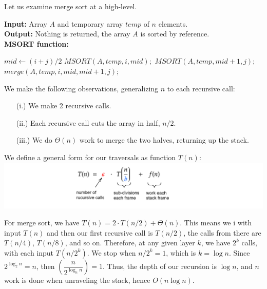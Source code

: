 \newpage 

\noindent
Let us examine merge sort at a high-level.
\begin{Func}
    \textbf{Input:} Array $A$ and temporary array $temp$ of $n$ elements.\\
    \textbf{Output:} Nothing is returned, the array $A$ is sorted by reference.\\

    \vspace{-.5em}
    \noindent
    \textbf{MSORT function:}\\
    \begin{algorithm}[H]
        \label{algo:mergesort}
            $mid \gets (i + j) / 2$\;
            $MSORT(A, temp, i, mid);$ 
            $MSORT(A, temp, mid + 1, j);$ 
            $merge(A, temp, i, mid, mid + 1, j);$ 
        
    \end{algorithm}
\end{Func}

\begin{Proof}

We make the following observations, generalizing $n$ to each recursive call:
\begin{enumerate}
    \item [(i.)] We make 2 recursive calls.
    \item [(ii.)] Each recursive call cuts the array in half, $n/2$.
    \item [(iii.)] We do $\Theta(n)$ work to merge the two halves, returning up the stack.
\end{enumerate}
\noindent
We define a general form for our traversals as function $T(n)$:\\


    \hspace{-4em}
    \includegraphics[width=1.2\textwidth]{sections/recurs/rec_form.png}

   
\noindent
For merge sort, we have $T(n) = 2\cdot T(n/2) + \Theta(n)$. This means we i with input $T(n)$ and then 
our first recursive call is $T(n/2)$, the calls from there are $T(n/4)$, $T(n/8)$, and so on. Therefore,
at any given layer $k$, we have $2^k$ calls, with each input $T(n/2^k)$. We stop when $n/2^k = 1$, which is $k = \log n$. Since $2^{\log_2 n} = n$, then $\left(\dfrac{n}{2^{\log_n n}}\right) = 1$.
Thus, the depth of our recursion is $\log n$, and $n$ work is done when unraveling the stack, hence $O(n \log n)$.

\end{Proof}

